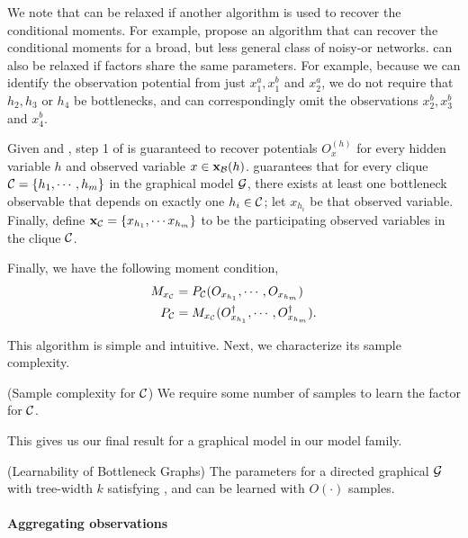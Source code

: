 We note that  can be relaxed if another
  algorithm is used to recover the conditional moments. For example,
  \citet{halpern13noisyor} propose an algorithm that can recover the
  conditional moments for a broad, but less general class of noisy-or
  networks.
 can also be relaxed if factors share the same
  parameters. 
For example, because we can identify the observation potential from just
  $x^a_1, x^b_1$ and $x^a_2$, we do not require that $h_2, h_3$ or $h_4$
  be bottlenecks, and can correspondingly omit the observations $x^b_2,
  x^b_3$ and $x^b_4$.

Given  and , step
  1 of  is guaranteed to recover potentials
  $O^{(h)}_{x}$ for every hidden variable $h$ and observed variable $x \in
  \mathbf{x}_{\mathcal{B}}(h)$.
 guarantees that for every clique $\mathcal{C}
  = \{h_1, \cdots, h_m\}$ in the graphical model $\mathcal{G}$, there exists at
  least one bottleneck observable that depends on exactly one $h_i \in
  \mathcal{C}$; let $x_{h_i}$ be that observed variable\verify. 
Finally, define $\mathbf{x}_{\mathcal{C}} = \{x_{h_1}, \cdots x_{h_m}\}$ to be the
  participating observed variables in the clique $\mathcal{C}$.

Finally, we have the following moment condition,
\begin{align*}
  M_{x_{\mathcal{C}}} &= P_{\mathcal{C}}(O_{x_{h_1}}, \cdots, O_{x_{h_m}}) \\
  P_{\mathcal{C}} &= M_{x_{\mathcal{C}}}({O}^{\dagger}_{x_{h_1}}, \cdots, {O}^{\dagger}_{x_{h_m}}).
\end{align*}

This algorithm is simple and intuitive. Next, we characterize its sample complexity.

\begin{lemma}(Sample complexity for $\mathcal{C}$)
We require some number of samples to learn the factor for $\mathcal{C}$.
\end{lemma}

This gives us our final result for a graphical model in our model
family.
\begin{theorem}(Learnability of Bottleneck Graphs)
The parameters for a directed graphical $\mathcal{G}$ with tree-width $k$
satisfying ,  and
 can be learned with $O(\cdot)$ samples.
\end{theorem}


\paragraph{Aggregating observations}

